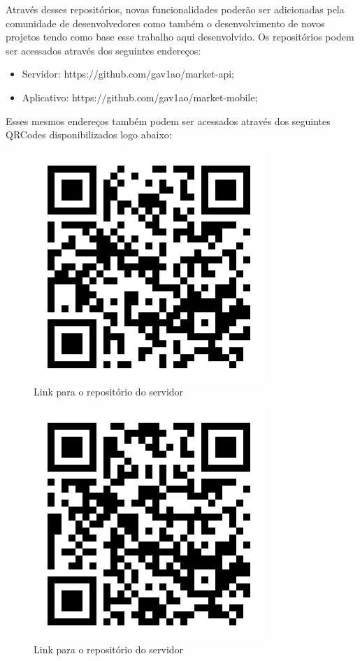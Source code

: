 Através desses repositórios, novas funcionalidades poderão ser adicionadas pela comunidade de desenvolvedores como também o desenvolvimento de novos projetos tendo como base esse trabalho aqui desenvolvido. Os repositórios podem ser acessados através dos seguintes endereços:
\begin{itemize}
\item Servidor: https://github.com/gav1ao/market-api;
\item Aplicativo: https://github.com/gav1ao/market-mobile;
\end{itemize}

Esses mesmos endereços também podem ser acessados através dos seguintes QRCodes disponibilizados logo abaixo:

\begin{figure}[h]
    \centering
    \includegraphics[scale=0.5]{tcc/figures/repo_qrcode/repo_github_market_api.png}
    \caption{Link para o repositório do servidor}
    \label{fig-repo-qrcode-api}
\end{figure}

\begin{figure}[h]
    \centering
    \includegraphics[scale=0.5]{tcc/figures/repo_qrcode/repo_github_market_app.png}
    \caption{Link para o repositório do servidor}
    \label{fig-repo-qrcode-app}
\end{figure}
